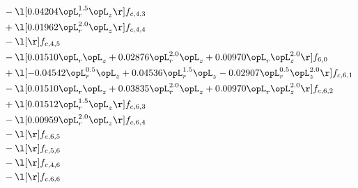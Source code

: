 \begin{alignat}{2}
& - \l[  0.04204 \opL_r^{1.5} \opL_z  \r] f_{c,4,3} \nonumber \\ 
& + \l[  0.01962 \opL_r^{2.0} \opL_z  \r] f_{c,4,4} \nonumber \\ 
& - \l[  \r] f_{c,4,5} \nonumber \\ 
& - \l[  0.01510 \opL_r \opL_z +  0.02876 \opL_r^{2.0} \opL_z +  0.00970 \opL_r \opL_z^{2.0}  \r] f_{6,0} \nonumber \\ 
& + \l[  -0.04542 \opL_r^{0.5} \opL_z +  0.04536 \opL_r^{1.5} \opL_z   -0.02907 \opL_r^{0.5} \opL_z^{2.0}  \r] f_{c,6,1} \nonumber \\ 
& - \l[  0.01510 \opL_r \opL_z +  0.03835 \opL_r^{2.0} \opL_z +  0.00970 \opL_r \opL_z^{2.0}  \r] f_{c,6,2} \nonumber \\ 
& + \l[  0.01512 \opL_r^{1.5} \opL_z  \r] f_{c,6,3} \nonumber \\ 
& - \l[  0.00959 \opL_r^{2.0} \opL_z  \r] f_{c,6,4} \nonumber \\ 
& - \l[  \r] f_{c,6,5} \nonumber \\ 
& - \l[  \r] f_{c,5,6} \nonumber \\ 
& - \l[  \r] f_{c,4,6} \nonumber \\ 
& - \l[  \r] f_{c,6,6} \nonumber \\ 
\end{alignat} 


